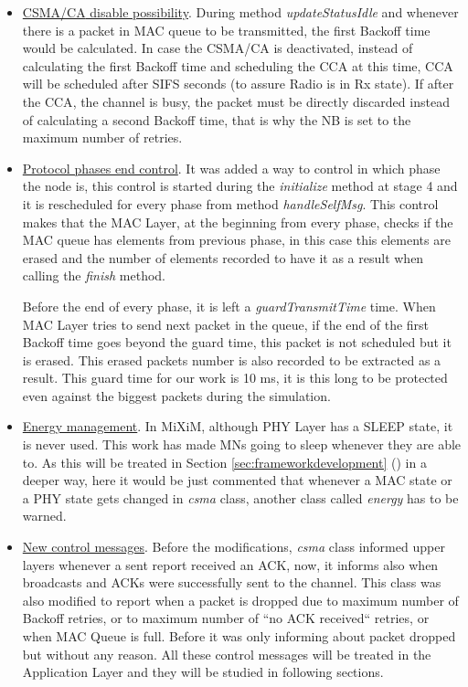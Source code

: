 \begin{itemize}
 \item \underline{\ac{CSMA/CA} disable possibility}. During method \textit{updateStatusIdle} and whenever there is a packet in \ac{MAC} queue to
be transmitted, the first Backoff time would be calculated. In case the \ac{CSMA/CA} is deactivated, instead of calculating the first Backoff
time and scheduling the \ac{CCA} at this time, \ac{CCA} will be scheduled after \ac{SIFS} seconds (to assure Radio is in Rx state). If after the
\ac{CCA}, the channel is busy, the packet must be directly discarded instead of calculating a second Backoff time, that is why the \ac{NB} is 
set to the maximum number of retries. 
 \item \underline{Protocol phases end control}. It was added a way to control in which phase the node is, this control is started during the
\textit{initialize} method at stage 4 and it is rescheduled for every phase from method \textit{handleSelfMsg}. This control makes that the 
\ac{MAC} Layer, at the beginning from every phase, checks if the \ac{MAC} queue has elements from previous phase, in this case this elements
are erased and the number of elements recorded to have it as a result when calling the \textit{finish} method.

Before the end of every phase, it is left a \textit{guardTransmitTime} time. When \ac{MAC} Layer tries to send next packet in the queue, if the end of 
the first Backoff time goes beyond the guard time, this packet is not scheduled but it is erased. This erased packets number is also recorded
to be extracted as a result. This guard time for our work is 10 ms, it is this long to be protected even against the biggest packets during the 
simulation.
 \item \underline{Energy management}. In \ac{MiXiM}, although \ac{PHY} Layer has a SLEEP state, it is never used. This work has made \acp{MN}
going to sleep whenever they are able to. As this will be treated in Section \ref{sec:frameworkdevelopment} ()
in a deeper way, here it would be just commented that whenever a \ac{MAC} state or a \ac{PHY} state gets changed in \textit{csma} class, another
class called \textit{energy} has to be warned.
 \item \underline{New control messages}. Before the modifications, \textit{csma} class informed upper layers whenever a sent report received an
\ac{ACK}, now, it informs also when broadcasts and \acp{ACK} were successfully sent to the channel. This class was also modified to 
report when a packet is dropped due to maximum number of Backoff retries, or to maximum number of ``no \ac{ACK} received`` retries, or when
\ac{MAC} Queue is full. Before it was only informing about packet dropped but without any reason. All these control messages will be treated 
in the Application Layer and they will be studied in following sections.
\end{itemize}

